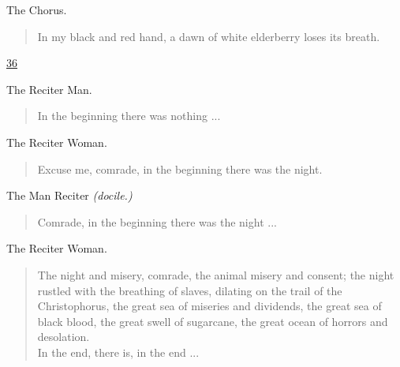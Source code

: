 \documentclass[letterpaper,article,12pt,oneside,notitlepage]{memoir}
\begin{document}
\begin{center}The Chorus.\end{center}

\begin{verse}
\hspace{1cm} In my black and red hand, a dawn of white elderberry loses its breath. \\
\end{verse}

\clearpage

\href{http://cesaire.elotroalex.com/chiens/chiens/p036.html}{36}

\begin{center}The Reciter Man.\end{center}

\begin{verse}
\hspace{1cm} In the beginning there was nothing ... \\
\end{verse}

\begin{center}The Reciter Woman.\end{center}

\begin{verse}
\hspace{1cm} Excuse me, comrade, in the beginning there was the night. \\
\end{verse}

\begin{center}The Man Reciter \textit{(docile.)}\end{center}

\begin{verse}
\hspace{1cm} Comrade, in the beginning there was the night ... \\
\end{verse}

\begin{center}The Reciter Woman.\end{center}

\begin{verse}
\indent The night and misery, comrade, the animal misery and consent; the night rustled with the breathing of slaves, dilating on the trail of the Christophorus, the great sea of miseries and dividends, the great sea of black blood, the great swell of sugarcane, the great ocean of horrors and desolation. \\
\hspace{1cm} In the end, there is, in the end ... \\
\end{verse}
\end{document}
